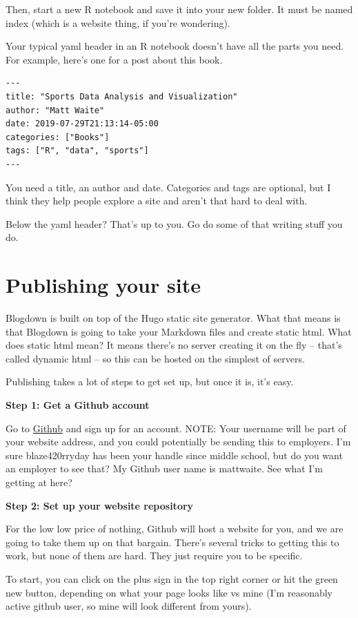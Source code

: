\documentclass[
]{book}
\begin{document}
Then, start a new R notebook and save it into your new folder. It must be named index (which is a website thing, if you're wondering).

Your typical yaml header in an R notebook doesn't have all the parts you need. For example, here's one for a post about this book.

\begin{verbatim}
---
title: "Sports Data Analysis and Visualization"
author: "Matt Waite"
date: 2019-07-29T21:13:14-05:00
categories: ["Books"]
tags: ["R", "data", "sports"]
---
\end{verbatim}

You need a title, an author and date. Categories and tags are optional, but I think they help people explore a site and aren't that hard to deal with.

Below the yaml header? That's up to you. Go do some of that writing stuff you do.

\hypertarget{publishing-your-site}{%
\section{Publishing your site}\label{publishing-your-site}}

Blogdown is built on top of the Hugo static site generator. What that means is that Blogdown is going to take your Markdown files and create static html. What does static html mean? It means there's no server creating it on the fly -- that's called dynamic html -- so this can be hosted on the simplest of servers.

Publishing takes a lot of steps to get set up, but once it is, it's easy.

\textbf{Step 1: Get a Github account}

Go to \href{https://github.com/}{Github} and sign up for an account. NOTE: Your username will be part of your website address, and you could potentially be sending this to employers. I'm sure blaze420rryday has been your handle since middle school, but do you want an employer to see that? My Github user name is mattwaite. See what I'm getting at here?

\textbf{Step 2: Set up your website repository}

For the low low price of nothing, Github will host a website for you, and we are going to take them up on that bargain. There's several tricks to getting this to work, but none of them are hard. They just require you to be specific.

To start, you can click on the plus sign in the top right corner or hit the green new button, depending on what your page looks like vs mine (I'm reasonably active github user, so mine will look different from yours).
\end{document}
